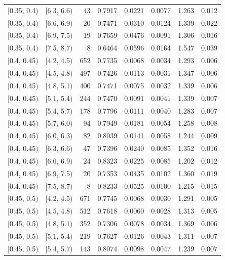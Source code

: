 \documentclass[11pt]{article}
\begin{document}
\begin{longtable}{| l | l | r | r | r | r | r | r |}
        $[$0.35, 0.4$)$ & $[$6.3, 6.6$)$ & 43 & 0.7917 & 0.0221 & 0.0077 & 1.263 & 0.012 \\
        $[$0.35, 0.4$)$ & $[$6.6, 6.9$)$ & 20 & 0.7471 & 0.0310 & 0.0124 & 1.339 & 0.022 \\
        $[$0.35, 0.4$)$ & $[$6.9, 7.5$)$ & 19 & 0.7659 & 0.0476 & 0.0091 & 1.306 & 0.016 \\
        $[$0.35, 0.4$)$ & $[$7.5, 8.7$)$ & 8 & 0.6464 & 0.0596 & 0.0164 & 1.547 & 0.039 \\
        $[$0.4, 0.45$)$ & $[$4.2, 4.5$)$ & 652 & 0.7735 & 0.0068 & 0.0034 & 1.293 & 0.006 \\
        $[$0.4, 0.45$)$ & $[$4.5, 4.8$)$ & 497 & 0.7426 & 0.0113 & 0.0031 & 1.347 & 0.006 \\
        $[$0.4, 0.45$)$ & $[$4.8, 5.1$)$ & 400 & 0.7471 & 0.0075 & 0.0032 & 1.339 & 0.006 \\
        $[$0.4, 0.45$)$ & $[$5.1, 5.4$)$ & 244 & 0.7470 & 0.0091 & 0.0041 & 1.339 & 0.007 \\
        $[$0.4, 0.45$)$ & $[$5.4, 5.7$)$ & 178 & 0.7796 & 0.0111 & 0.0040 & 1.283 & 0.007 \\
        $[$0.4, 0.45$)$ & $[$5.7, 6.0$)$ & 94 & 0.7949 & 0.0181 & 0.0054 & 1.258 & 0.008 \\
        $[$0.4, 0.45$)$ & $[$6.0, 6.3$)$ & 82 & 0.8039 & 0.0141 & 0.0058 & 1.244 & 0.009 \\
        $[$0.4, 0.45$)$ & $[$6.3, 6.6$)$ & 47 & 0.7396 & 0.0240 & 0.0085 & 1.352 & 0.016 \\
        $[$0.4, 0.45$)$ & $[$6.6, 6.9$)$ & 24 & 0.8323 & 0.0225 & 0.0085 & 1.202 & 0.012 \\
        $[$0.4, 0.45$)$ & $[$6.9, 7.5$)$ & 20 & 0.7353 & 0.0435 & 0.0102 & 1.360 & 0.019 \\
        $[$0.4, 0.45$)$ & $[$7.5, 8.7$)$ & 8 & 0.8233 & 0.0525 & 0.0100 & 1.215 & 0.015 \\
        $[$0.45, 0.5$)$ & $[$4.2, 4.5$)$ & 671 & 0.7745 & 0.0068 & 0.0030 & 1.291 & 0.005 \\
        $[$0.45, 0.5$)$ & $[$4.5, 4.8$)$ & 512 & 0.7618 & 0.0060 & 0.0028 & 1.313 & 0.005 \\
        $[$0.45, 0.5$)$ & $[$4.8, 5.1$)$ & 352 & 0.7306 & 0.0078 & 0.0034 & 1.369 & 0.006 \\
        $[$0.45, 0.5$)$ & $[$5.1, 5.4$)$ & 219 & 0.7627 & 0.0126 & 0.0043 & 1.311 & 0.007 \\
        $[$0.45, 0.5$)$ & $[$5.4, 5.7$)$ & 143 & 0.8074 & 0.0098 & 0.0047 & 1.239 & 0.007 \\

\end{longtable}
\end{document}
